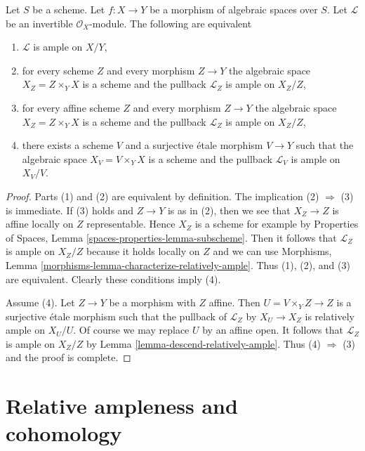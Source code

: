 \begin{lemma}
\label{lemma-relatively-ample-local}
Let $S$ be a scheme. Let $f : X \to Y$ be a morphism of algebraic spaces
over $S$. Let $\mathcal{L}$ be an invertible $\mathcal{O}_X$-module.
The following are equivalent
\begin{enumerate}
\item $\mathcal{L}$ is ample on $X/Y$,
\item for every scheme $Z$ and every morphism $Z \to Y$
the algebraic space $X_Z = Z \times_Y X$ is a scheme
and the pullback $\mathcal{L}_Z$ is ample on $X_Z/Z$,
\item for every affine scheme $Z$ and every morphism $Z \to Y$
the algebraic space $X_Z = Z \times_Y X$ is a scheme
and the pullback $\mathcal{L}_Z$ is ample on $X_Z/Z$,
\item there exists a scheme $V$ and a surjective \'etale morphism
$V \to Y$ such that the algebraic space $X_V = V \times_Y X$ is a scheme
and the pullback $\mathcal{L}_V$ is ample on $X_V/V$.
\end{enumerate}
\end{lemma}

\begin{proof}
Parts (1) and (2) are equivalent by definition.
The implication (2) $\Rightarrow$ (3) is immediate.
If (3) holds and $Z \to Y$ is as in (2), then we see
that $X_Z \to Z$ is affine locally on $Z$ representable.
Hence $X_Z$ is a scheme for example by
Properties of Spaces, Lemma \ref{spaces-properties-lemma-subscheme}.
Then it follows that $\mathcal{L}_Z$ is ample on $X_Z/Z$ because
it holds locally on $Z$ and we can use
Morphisms, Lemma \ref{morphisms-lemma-characterize-relatively-ample}.
Thus (1), (2), and (3) are equivalent. Clearly these conditions
imply (4).

\medskip\noindent
Assume (4). Let $Z \to Y$ be a morphism with $Z$ affine.
Then $U = V \times_Y Z \to Z$ is a surjective \'etale morphism
such that the pullback of $\mathcal{L}_Z$ by $X_U \to X_Z$
is relatively ample on $X_U/U$.
Of course we may replace $U$ by an affine open.
It follows that $\mathcal{L}_Z$ is ample on $X_Z/Z$ by
Lemma \ref{lemma-descend-relatively-ample}.
Thus (4) $\Rightarrow$ (3) and the proof is complete.
\end{proof}





\section{Relative ampleness and cohomology}
\label{section-ample-and-proper}

